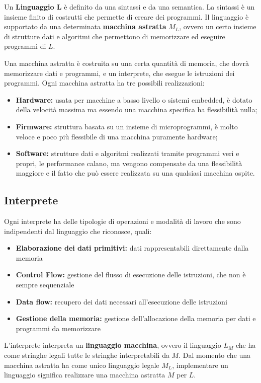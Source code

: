 \documentclass{article}[10pt]
\begin{document}
	Un \textbf{Linguaggio L} è definito da una sintassi e da una semantica. La sintassi è un insieme finito di costrutti che permette di creare dei programmi. Il linguaggio è supportato da una determinata \textbf{macchina astratta} $M_L$, ovvero un certo insieme di strutture dati e algoritmi che permettono di memorizzare ed eseguire programmi di $L$.
	
	Una macchina astratta è costruita su una certa quantità di memoria, che dovrà memorizzare dati e programmi, e un interprete, che esegue le istruzioni dei programmi.
	Ogni macchina astratta ha tre possibili realizzazioni:
	\begin{itemize}
		\item \textbf{Hardware:} usata per macchine a basso livello o sistemi embedded, è dotato della velocità massima ma essendo una macchina specifica ha flessibilità nulla;
		\item \textbf{Firmware:} struttura basata su un insieme di microprogrammi, è molto veloce e poco più flessibile di una macchina puramente hardware;
		\item \textbf{Software:} strutture dati e algoritmi realizzati tramite programmi veri e propri, le performance calano, ma vengono compensate da una flessibilità maggiore e il fatto che può essere realizzata su una qualsiasi macchina ospite.
	\end{itemize}
	
	\subsection{Interprete}
	Ogni interprete ha delle tipologie di operazioni e modalità di lavoro che sono indipendenti dal linguaggio che riconosce, quali:
	\begin{itemize}
		\item \textbf{Elaborazione dei dati primitivi:} dati rappresentabili direttamente dalla memoria
		\item \textbf{Control Flow:} gestione del flusso di esecuzione delle istruzioni, che non è sempre sequenziale
		\item \textbf{Data flow:} recupero dei dati necessari all'esecuzione delle istruzioni
		\item \textbf{Gestione della memoria:} gestione dell'allocazione della memoria per dati e programmi da memorizzare
	\end{itemize}

	L'interprete interpreta un \textbf{linguaggio macchina}, ovvero il linguaggio $L_M$ che ha come stringhe legali tutte le stringhe interpretabili da $M$. Dal momento che una macchina astratta ha come unico linguaggio legale $M_L$, implementare un linguaggio significa realizzare una macchina astratta $M$ per $L$.\\
	
\end{document}
